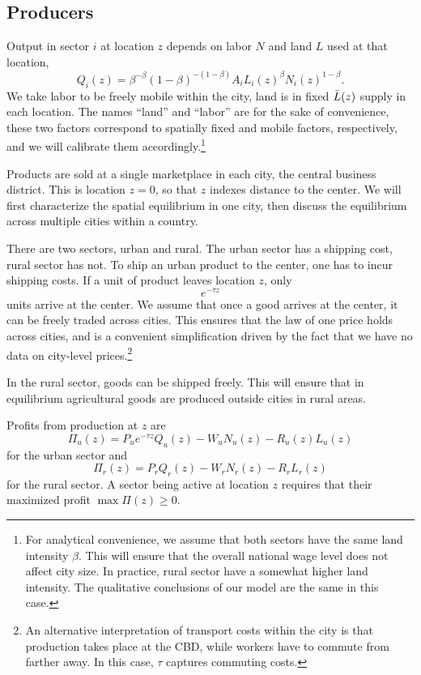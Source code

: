 \documentclass[12pt]{article}
\begin{document}
\subsection{Producers}
Output in sector $i$ at location $z$ depends on labor $N$ and land $L$ used at that location,
\[
Q_i(z) =\beta^{-\beta}(1-\beta)^{-(1-\beta)} A_i L_i(z)^{\beta}N_i(z)^{1-\beta}.
\]
We take labor to be freely mobile within the city, land is in fixed $\Bar{L}(z)$ supply in each location. The names ``land'' and ``labor'' are for the sake of convenience, these two factors correspond to spatially fixed and mobile factors, respectively, and we will calibrate them accordingly.\footnote{For analytical convenience, we assume that both sectors have the same land intensity $\beta$. This will ensure that the overall national wage level does not affect city size. In practice, rural sector have a somewhat higher land intensity. The qualitative conclusions of our model are the same in this case.}

Products are sold at a single marketplace in each city, the central business district. This is location $z=0$, so that $z$ indexes distance to the center. We will first characterize the spatial equilibrium in one city, then discuss the equilibrium across multiple cities within a country.

There are two sectors, urban and rural. The urban sector has a shipping cost, rural sector has not.
To ship an urban product to the center, one has to incur shipping costs. If a unit of product leaves location $z$, only
\[
e^{-\tau z}
\]
units arrive at the center. We assume that once a good arrives at the center, it can be freely traded across cities. This ensures that the law of one price holds across cities, and is a convenient simplification driven by the fact that we have no data on city-level prices.\footnote{An alternative interpretation of transport costs within the city is that production takes place at the CBD, while workers have to commute from farther away. In this case, $\tau$ captures commuting costs.}

In the rural sector, goods can be shipped freely. This will ensure that in equilibrium agricultural goods are produced outside cities in rural areas.

Profits from production at $z$ are
\begin{equation}
\label{eq:profit}
\Pi_u(z)=P_ue^{-\tau z}Q_u(z)-W_uN_u(z)-R_u(z)L_u(z)
\end{equation}
for the urban sector and
\begin{equation}
\label{eq:profit:rural}
\Pi_r(z)=P_r Q_r(z)-W_rN_r(z)-R_rL_r(z)
\end{equation}
for the rural sector. A sector being active at location $z$ requires that their maximized profit $\max\Pi(z)\geq0$.
\end{document}
